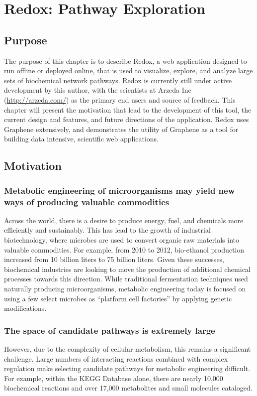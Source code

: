 \chapter{Redox: Pathway Exploration}
\label{chap:redox}

\section{Purpose}
The purpose of this chapter is to describe Redox, a web application designed to run offline or deployed online, that is used to visualize, explore, and analyze large sets of biochemical network pathways.
Redox is currently still under active development by this author, with the scientists at Arzeda Inc (\url{http://arzeda.com/}) as the primary end users and source of feedback.
This chapter will present the motivation that lead to the development of this tool, the current design and features, and future directions of the application.
Redox uses Graphene extensively, and demonstrates the utility of Graphene as a tool for building data intensive, scientific web applications.

\section{Motivation}
\subsection{Metabolic engineering of microorganisms may yield new ways of producing valuable commodities}

Across the world, there is a desire to produce energy, fuel, and chemicals more efficiently and sustainably.
This has lead to the growth of industrial biotechnology, where microbes are used to convert organic raw materials into valuable commodities. \autocite{nielsen1998metabolic, sauer2012construction}
For example, from 2010 to 2012, bio-ethanol production increased from 10 billion liters to 75 billion liters.
Given these successes, biochemical industries are looking to move the production of additional chemical processes towards this direction.
While traditional fermentation techniques used naturally producing microorganisms, metabolic engineering today is focused on using a few select microbes as “platform cell factories” by applying genetic modifications.

\subsection{The space of candidate pathways is extremely large}
However, due to the complexity of cellular metabolism, this remains a significant challenge. \autocite{sohn2010genome}
Large numbers of interacting reactions combined with complex regulation make selecting candidate pathways for metabolic engineering difficult.
For example, within the KEGG Database \autocite{ogata1999keg} alone, there are nearly 10,000 biochemical reactions and over 17,000 metabolites and small molecules cataloged.

